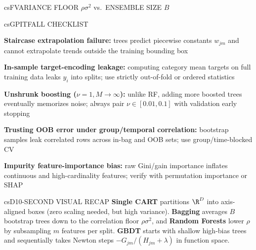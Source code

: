 \documentclass[../../../../master.tex]{subfiles}
\begin{document}
\begin{cscolumns}
\begin{cscard}{csF}{VARIANCE FLOOR $\rho\sigma^2$ vs.\ ENSEMBLE SIZE $B$}
  \centering
\end{cscard}
\columnbreak

\begin{cscard}{csG}{PITFALL CHECKLIST}
  \begin{csbul}
    \item \textbf{Staircase extrapolation failure:} trees predict piecewise constants $w_{jm}$ and cannot extrapolate trends outside the training bounding box
    \item \textbf{In-sample target-encoding leakage:} computing category mean targets on full training data leaks $y_i$ into splits; use strictly out-of-fold or ordered statistics
    \item \textbf{Unshrunk boosting ($\nu=1, M\to\infty$):} unlike RF, adding more boosted trees eventually memorizes noise; always pair $\nu\in[0.01,0.1]$ with validation early stopping
    \item \textbf{Trusting OOB error under group/temporal correlation:} bootstrap samples leak correlated rows across in-bag and OOB sets; use group/time-blocked CV
    \item \textbf{Impurity feature-importance bias:} raw Gini/gain importance inflates continuous and high-cardinality features; verify with permutation importance or SHAP
  \end{csbul}
\end{cscard}

\begin{cscard}{csD}{10-SECOND VISUAL RECAP}
  \sffamily\footnotesize
  \textbf{Single CART} partitions $\R^D$ into axis-aligned boxes (zero scaling needed, but high variance).
  \textbf{Bagging} averages $B$ bootstrap trees down to the correlation floor $\rho\sigma^2$, and \textbf{Random Forests} lower $\rho$ by subsampling $m$ features per split.
  \textbf{GBDT} starts with shallow high-bias trees and sequentially takes Newton steps $-G_{jm}/(H_{jm}+\lambda)$ in function space.
\end{cscard}
\end{cscolumns}

\csend
\end{document}
